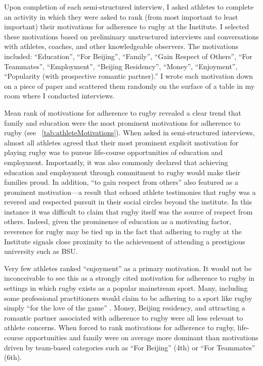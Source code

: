 \begin{CJK}{UTF8}{gbsn}
Upon completion of each semi-structured interview, I asked athletes to complete an activity in which they were asked to rank (from most important to least important) their motivations for adherence to rugby at the Institute.  I selected these motivations based on preliminary unstructured interviews and conversations with athletes, coaches, and other knowledgeable observers.  The motivations included: ``Education'', ``For Beijing'', ``Family'', ``Gain Respect of Others'', ``For Teammates'', ``Employment'', ``Beijing Residency'', ``Money'', ``Enjoyment'', ``Popularity (with prospective romantic partner).'' I wrote each motivation down on a piece of paper and scattered them randomly on the surface of a table in my room where I conducted interviews.

Mean rank of motivations for adherence to rugby revealed a clear trend that family and education were the most prominent motivations for adherence to rugby (see ~\ref{tab:athleteMotivations}).  When asked in semi-structured interviews, almost all athletes agreed that their most prominent explicit motivation for playing rugby was to pursue life-course opportunities of education and employment.  Importantly, it was also commonly declared that achieving education and employment through commitment to rugby would make their families proud.  In addition, ``to gain respect from others'' also featured as a prominent motivation—a result that echoed athlete testimonies that rugby was a revered and respected pursuit in their social circles beyond the institute.  In this instance it was difficult to claim that rugby itself was the source of respect from others.  Indeed, given the prominence of education as a motivating factor, reverence for rugby may be tied up in the fact that adhering to rugby at the Institute signals close proximity to the achievement of attending a prestigious university such as BSU.

Very few athletes ranked ``enjoyment'' as a primary motivation.   It would not be inconceivable to see this as a strongly cited motivation for adherence to rugby in settings in which rugby exists as a popular mainstream sport.  Many, including some professional practitioners would claim to be adhering to a sport like rugby simply ``for the love of the game'' \citep{Jackson1998}.  Money, Beijing residency, and attracting a romantic partner associated with adherence to rugby were all less relevant to athlete concerns.  When forced to rank motivations for adherence to rugby, life-course opportunities and family were on average more dominant than motivations driven by team-based categories such as ``For Beijing'' (4th) or ``For Teammates'' (6th).
                     


\end{CJK}

